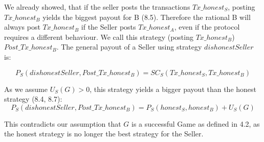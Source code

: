 \documentclass{cacthesis}
\begin{document}
We already showed, that if the seller posts the transactions $Tx\_honest_S$, posting $Tx\_honest_B$ yields the biggest payout for B (8.5).\newline
Therefore the rational B will always post $Tx\_honest_B$ if the Seller posts $Tx\_honest_A$, even if the protocol requires a different behaviour. We call this strategy (posting $Tx\_honest_B$) $Post\_Tx\_honest_B$.\newline
The general payout of a Seller using strategy $dishonestSeller$ is:

\begin{equation}
    P_S(dishonestSeller,Post\_Tx\_honest_B) = SC_S(Tx\_honest_S,Tx\_honest_B)
\end{equation}

As we assume $U_S(G) > 0$, this strategy yields a bigger payout than the honest strategy (8.4, 8.7):
\[P_S(dishonestSeller,Post\_Tx\_honest_B) = P_S(honest_S,honest_B) + U_S(G)\]

This contradicts our assumption that $G$ is a successful Game as defined in 4.2, as the honest strategy is no longer the best strategy for the Seller.
	
	
	\appendix
\end{document}
